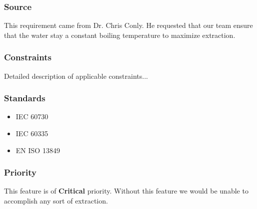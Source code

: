 \subsubsection{Source}
This requirement came from Dr. Chris Conly. He requested that our team ensure
that the water stay a constant boiling temperature to maximize extraction.  
\subsubsection{Constraints}
Detailed description of applicable constraints...
\subsubsection{Standards}
\begin{itemize}
\item IEC 60730
\item IEC 60335
\item EN ISO 13849
\end{itemize}
\subsubsection{Priority}
This feature is of \textbf{Critical} priority. Without this feature we would be unable to
accomplish any sort of extraction. 
